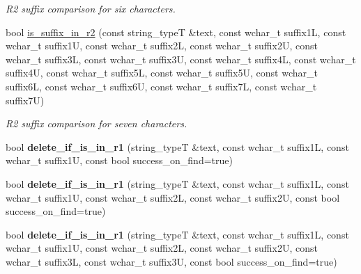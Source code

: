 \begin{DoxyCompactItemize}
\begin{DoxyCompactList}\small\item\em R2 suffix comparison for six characters. \end{DoxyCompactList}\item 
\hypertarget{group___stemming_ga65e9882d17885e66208840b277fcee2e}{bool \hyperlink{group___stemming_ga65e9882d17885e66208840b277fcee2e}{is\-\_\-suffix\-\_\-in\-\_\-r2} (const string\-\_\-type\-T \&text, const wchar\-\_\-t suffix1\-L, const wchar\-\_\-t suffix1\-U, const wchar\-\_\-t suffix2\-L, const wchar\-\_\-t suffix2\-U, const wchar\-\_\-t suffix3\-L, const wchar\-\_\-t suffix3\-U, const wchar\-\_\-t suffix4\-L, const wchar\-\_\-t suffix4\-U, const wchar\-\_\-t suffix5\-L, const wchar\-\_\-t suffix5\-U, const wchar\-\_\-t suffix6\-L, const wchar\-\_\-t suffix6\-U, const wchar\-\_\-t suffix7\-L, const wchar\-\_\-t suffix7\-U)}\label{group___stemming_ga65e9882d17885e66208840b277fcee2e}

\begin{DoxyCompactList}\small\item\em R2 suffix comparison for seven characters. \end{DoxyCompactList}\item 
\hypertarget{group___stemming_ga3bda630783eae1661f00fc5d2b51ce5c}{bool {\bfseries delete\-\_\-if\-\_\-is\-\_\-in\-\_\-r1} (string\-\_\-type\-T \&text, const wchar\-\_\-t suffix1\-L, const wchar\-\_\-t suffix1\-U, const bool success\-\_\-on\-\_\-find=true)}\label{group___stemming_ga3bda630783eae1661f00fc5d2b51ce5c}

\item 
\hypertarget{group___stemming_ga843e54b874cbb56a5d5997987137c933}{bool {\bfseries delete\-\_\-if\-\_\-is\-\_\-in\-\_\-r1} (string\-\_\-type\-T \&text, const wchar\-\_\-t suffix1\-L, const wchar\-\_\-t suffix1\-U, const wchar\-\_\-t suffix2\-L, const wchar\-\_\-t suffix2\-U, const bool success\-\_\-on\-\_\-find=true)}\label{group___stemming_ga843e54b874cbb56a5d5997987137c933}

\item 
\hypertarget{group___stemming_gaf5c33c5c4644373cd85390c7e3282084}{bool {\bfseries delete\-\_\-if\-\_\-is\-\_\-in\-\_\-r1} (string\-\_\-type\-T \&text, const wchar\-\_\-t suffix1\-L, const wchar\-\_\-t suffix1\-U, const wchar\-\_\-t suffix2\-L, const wchar\-\_\-t suffix2\-U, const wchar\-\_\-t suffix3\-L, const wchar\-\_\-t suffix3\-U, const bool success\-\_\-on\-\_\-find=true)}\label{group___stemming_gaf5c33c5c4644373cd85390c7e3282084}


\end{DoxyCompactItemize}
